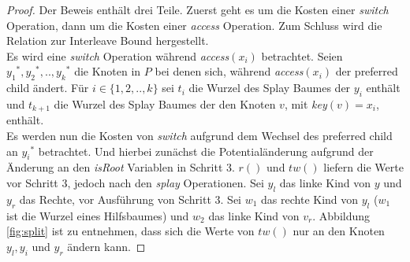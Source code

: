 \documentclass[a4paper,12pt]{article}
\begin{document}
\begin{proof}
	Der Beweis enthält drei Teile. Zuerst geht es um die Kosten einer \textit{switch} Operation, dann um die Kosten einer  \textit{access} Operation. Zum Schluss wird die Relation zur Interleave Bound hergestellt.\\
	Es wird eine \textit{switch} Operation während \textit{access}$\left(x_i\right)$ betrachtet. Seien ${y_1}^*, {y_2}^*,..,{y_k}^*$ die Knoten in $P$ bei denen sich, während  \textit{access}$\left(x_i\right)$ der preferred child ändert. Für $i \in \{1, 2,.., k\}$ sei $t_i$ die Wurzel des Splay Baumes der $y_i$ enthält und $t_{k+1}$ die Wurzel des Splay Baumes der den Knoten $v$, mit \textit{key}$\left(v\right) = x_i$, enthält.\\
	Es werden nun die Kosten von \textit{switch} aufgrund dem Wechsel des preferred child an ${y_i}^*$ betrachtet. Und hierbei zunächst die Potentialänderung aufgrund der Änderung an den \textit{isRoot} Variablen in Schritt 3.  $r\left(\right)$ und $\mathit{tw}\left(\right)$ liefern die Werte vor Schritt 3, jedoch nach den \textit{splay} Operationen. Sei $y_l$ das linke Kind von $y$ und $y_r$ das Rechte, vor Ausführung von Schritt 3. Sei $w_1$ das rechte Kind von $y_l$ ($w_1$ ist die Wurzel eines Hilfsbaumes) und $w_2$ das linke Kind von $v_r$. Abbildung \ref{fig:split} ist zu entnehmen, dass sich die Werte von $\mathit{tw}\left(\right)$ nur an den Knoten $y_l, y_i$ und $y_r$ ändern kann.
	 

\end{proof}
\end{document}
